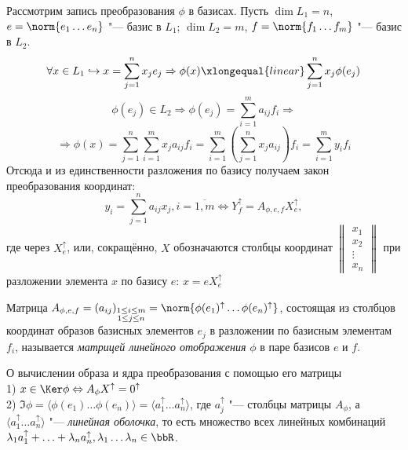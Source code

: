 Рассмотрим запись преобразования $\phi$  в базисах. Пусть $\dim L_1 = n$, $e=\norm{e_1 \ldots e_n}$ "--- базис в $L_1$; $\dim L_2 = m$, $f=\norm{f_1 \ldots f_m}$ "--- базис в $L_2$.
\begin{equation*}
\forall x \in L_1 \hookrightarrow x=\sum_{j=1}^n x_je_j \Rightarrow \phi(x)\xlongequal{linear}\sum_{j=1}^n x_j\phi(e_j) 
\end{equation*}
\begin{equation*}
\phi(e_j) \in L_2 \Rightarrow \phi(e_j)=\sum_{i=1}^m a_{ij}f_i \Rightarrow 
\end{equation*}
\begin{equation*}
\Rightarrow \phi(x)=\sum_{j=1}^n\sum_{i=1}^m x_ja_{ij}f_i = \sum_{i=1}^m(\sum_{j=1}^n x_ja_{ij})f_i = \sum_{i=1}^m y_if_i
\end{equation*}
Отсюда и из единственности разложения по базису получаем закон преобразования координат:
\begin{equation}
y_i=\sum_{j=1}^n a_{ij}x_j, i=\overline{1,m} \Leftrightarrow Y_f^\uparrow=A_{\phi,e,f}X_e^\uparrow,
\end{equation}
где через $X_e^\uparrow$, или, сокращённо, $X$ обозначаются столбцы координат $\begin{Vmatrix}
x_1 \\ x_2 \\ \vdots \\ x_n
\end{Vmatrix}$ при разложении элемента $x$ по базису $e$: $x=e X_e^\uparrow$
\begin{defn}
Матрица $A_{\phi,e,f}=(a_{ij})_{\substack{ 1\le i\le m \\ 1\le j\le n }}=\norm{\phi(e_1)^\uparrow \ldots \phi(e_n)^\uparrow}$, состоящая из столбцов координат образов базисных элементов $e_j$ в разложении по базисным элементам $f_i$, называется \textit{матрицей линейного отображения} $\phi$ в паре базисов $e$ и $f$.
\end{defn}
\begin{stt}\label{22.1.KerIm} {О вычислении образа и ядра преобразования с помощью его матрицы} $ $\\
1) $x \in \Ker\phi \Leftrightarrow A_\phi X^\uparrow=0^\uparrow$ \\
2) $\Im\phi=\langle\phi(e_1) \ldots \phi(e_n)\rangle=\langle a_1^\uparrow \ldots a_n^\uparrow\rangle$, где $a_j^\uparrow$ "--- столбцы матрицы $A_\phi$, а $\langle a_1^\uparrow \ldots a_n^\uparrow\rangle$ "--- \textit{линейная оболочка}, то есть множество всех линейных комбинаций $\lambda_1 a_1^\uparrow + \ldots + \lambda_n a_n^\uparrow, \lambda_1\ldots\lambda_n \in \bbR$.
\end{stt}
